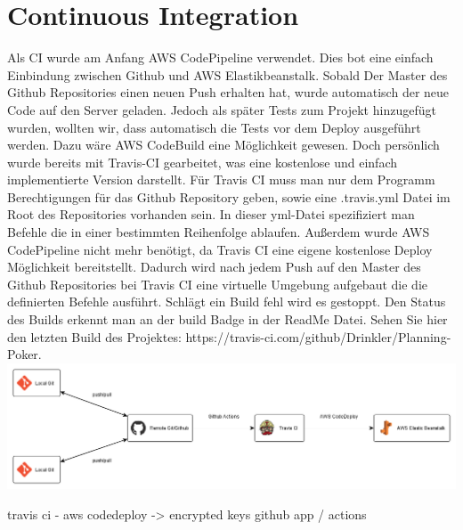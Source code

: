 \chapter{Continuous Integration}
Als CI wurde am Anfang AWS CodePipeline verwendet. Dies bot eine einfach Einbindung zwischen Github und AWS Elastikbeanstalk. Sobald Der Master des Github Repositories einen neuen Push erhalten hat, wurde automatisch der neue Code auf den Server geladen. Jedoch als später Tests zum Projekt hinzugefügt wurden, wollten wir, dass automatisch die Tests vor dem Deploy ausgeführt werden. Dazu wäre AWS CodeBuild eine Möglichkeit gewesen. Doch persönlich wurde bereits mit Travis-CI gearbeitet, was eine kostenlose und einfach implementierte Version darstellt. Für Travis CI muss man nur dem Programm Berechtigungen für das Github Repository geben, sowie eine .travis.yml Datei im Root des Repositories vorhanden sein. In dieser yml-Datei spezifiziert man Befehle die in einer bestimmten Reihenfolge ablaufen. Außerdem wurde AWS CodePipeline nicht mehr benötigt, da Travis CI eine eigene kostenlose Deploy Möglichkeit bereitstellt.
Dadurch wird nach jedem Push auf den Master des Github Repositories bei Travis CI eine virtuelle Umgebung aufgebaut die die definierten Befehle ausführt. Schlägt ein Build fehl wird es gestoppt. Den Status des Builds erkennt man an der build Badge in der ReadMe Datei. Sehen Sie hier den letzten Build des Projektes: https://travis-ci.com/github/Drinkler/Planning-Poker.
\includegraphics[width=\textwidth]{images/continuous_integration.png}

travis ci - aws codedeploy -> encrypted keys
github app / actions